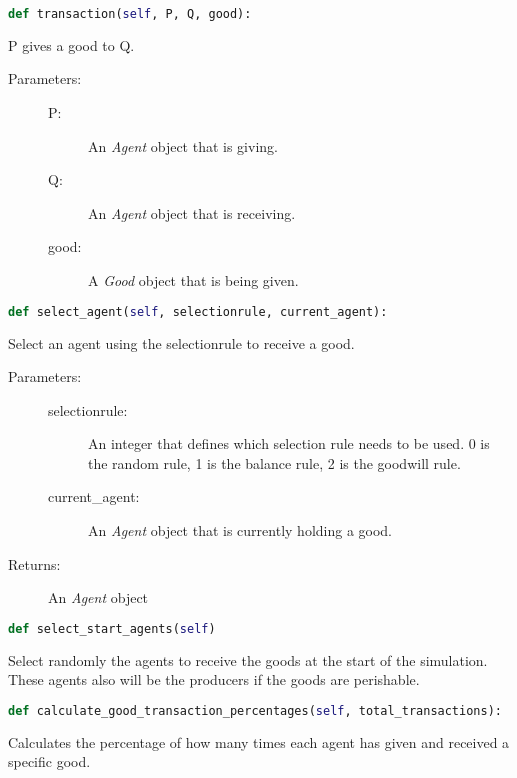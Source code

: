 \documentclass{article}
\begin{document}
\begin{lstlisting}[language=Python]
def transaction(self, P, Q, good):
\end{lstlisting}
P gives a good to Q.

\begin{description}
  \item[Parameters:] \hfill
	\begin{description}
  		\item[P:] An \textit{Agent} object that is giving.
		\item[Q:] An \textit{Agent} object that is receiving.
		\item[good:] A \textit{Good} object that is being given.
	\end{description}

\end{description}

\begin{lstlisting}[language=Python]
def select_agent(self, selectionrule, current_agent):
\end{lstlisting}
Select an agent using the selectionrule to receive a good.

\begin{description}
  \item[Parameters:] \hfill
	\begin{description}
  		\item[selectionrule:] An integer that defines which selection rule needs to be used. 0 is the random rule, 1 is the balance rule, 2 is the goodwill rule.
		\item[current\_agent:] An \textit{Agent} object that is currently holding a good.
	\end{description}
  \item[Returns:] An \textit{Agent} object

\end{description}

\begin{lstlisting}[language=Python]
def select_start_agents(self)
\end{lstlisting}
Select randomly the agents to receive the goods at the start of the simulation. These agents also will be the producers if the goods are perishable.

\begin{lstlisting}[language=Python]
def calculate_good_transaction_percentages(self, total_transactions):
\end{lstlisting}
Calculates the percentage of how many times each agent has given and received a specific good.
\end{document}
